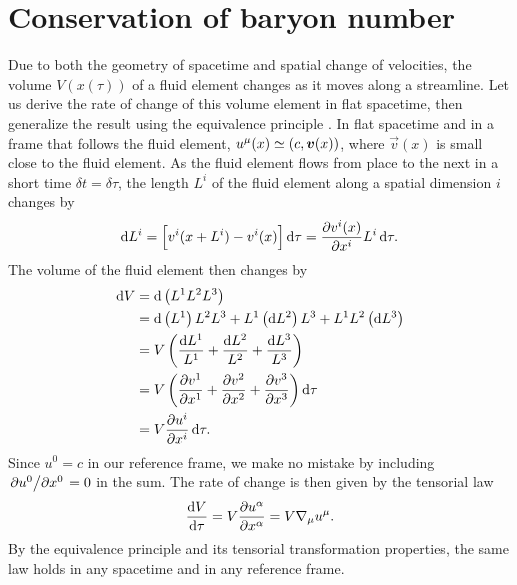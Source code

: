 \section{Conservation of baryon number}


Due to both the geometry of spacetime and spatial change of velocities, the volume $V(x(\tau))$ of a fluid element changes as it moves along a streamline.
Let us derive the rate of change of this volume element in flat spacetime, then generalize the result using the equivalence principle .
In flat spacetime and in a frame that follows the fluid element, $u^\mu(x) \simeq (c, {\bm{v}}(x))$, where $\vec{v}(x)$ is small close to the fluid element.
As the fluid element flows from place to the next in a short time $\delta t = \delta \tau$, the length $L^i$ of the fluid element along a spatial dimension $i$ changes by
\begin{equation}
	\mathop{}\!\mathrm{d} L^i = \Big[ v^i(x+L^i) - v^i(x) \Big] \mathop{}\!\mathrm{d} \tau 
	         = \pdv{v^i(x)}{x^i} L^i \mathop{}\!\mathrm{d} \tau.
\end{equation}
The volume of the fluid element then changes by
\begin{equation}
\begin{split}
	\dif V &= \dif \left( L^1 L^2 L^3 \right) \\
	       &= \dif \left( L^1 \right) L^2 L^3 + L^1 \left( \dif L^2 \right) L^3 + L^1 L^2 \left( \dif L^3 \right) \\
	       &= V \left( \frac{\dif L^1}{L^1} + \frac{\dif L^2}{L^2} + \frac{\dif L^3}{L^3} \right) \\
	       &= V \left( \pdv{v^1}{x^1} + \pdv{v^2}{x^2} + \pdv{v^3}{x^3} \right) \dif \tau \\
	       &= V \pdv{u^i}{x^i} \dif \tau .
\end{split}
\end{equation}
Since $u^0 = c$ in our reference frame, we make no mistake by including $\pdv{u^0}/{x^0} = 0$ in the sum.
The rate of change is then given by the tensorial law
\begin{equation}
	\odv{V}{\tau} = V \pdv{u^\alpha}{x^\alpha} = V \nabla_\mu u^\mu .
\label{eq:relfluid:volume_rate_change}
\end{equation}
By the equivalence principle and its tensorial transformation properties, the same law holds in any spacetime and in any reference frame.

